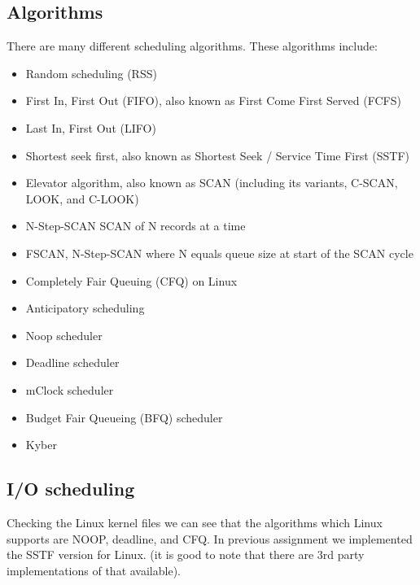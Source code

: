 \documentclass[journal,10pt,onecolumn,compsoc,letterpaper,draftclsnofoot,table,xcdraw]{IEEEtran} \usepackage[margin=0.75in]{geometry}
\begin{document}
\subsection{Algorithms}
\noindent There are many different scheduling algorithms. These algorithms include: 
\begin{itemize}
\item Random scheduling (RSS)
\item First In, First Out (FIFO), also known as First Come First Served (FCFS)
\item Last In, First Out (LIFO)
\item Shortest seek first, also known as Shortest Seek / Service Time First (SSTF)
\item Elevator algorithm, also known as SCAN (including its variants, C-SCAN, LOOK, and C-LOOK)
\item N-Step-SCAN SCAN of N records at a time
\item FSCAN, N-Step-SCAN where N equals queue size at start of the SCAN cycle
\item Completely Fair Queuing (CFQ) on Linux
\item Anticipatory scheduling
\item Noop scheduler
\item Deadline scheduler
\item mClock scheduler \cite{2}
\item Budget Fair Queueing (BFQ) scheduler \cite{3}
\item Kyber \cite{4}
\end{itemize}

\subsection{I/O scheduling}
\noindent Checking the Linux kernel files we can see that the algorithms which Linux supports are NOOP, deadline, and CFQ. In previous assignment we implemented the SSTF version for Linux. (it is good to note that there are 3rd party implementations of that available).
\end{document}
